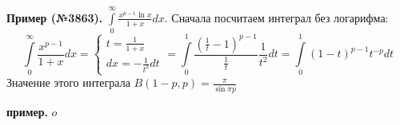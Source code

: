\textbf{Пример (№3863).} $\int\limits_{0}^{\infty}\frac{x^{p-1}\ln x}{1+x}dx$.
Сначала посчитаем интеграл без логарифма: 
$$\int\limits_{0}^{\infty}\frac{x^{p-1}}{1+x}dx=
\begin{cases}t=\frac{1}{1+x}\\dx=-\frac{1}{t^2}dt   
\end{cases}=
\int\limits_{0}^{1} \frac{(\frac{1}{t}-1)^{p-1}}{\frac{1}{t}}\frac{1}{t^2}dt=
\int\limits_{0}^{1}(1-t)^{p-1}t^{-p}dt
$$
Значение этого интеграла $B(1-p,p)=\frac{\pi}{\sin\pi p}$ 


\textbf{пример.} $o$













